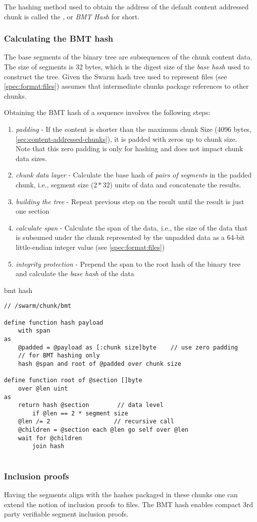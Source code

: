 The hashing method used to obtain the address of the default content addressed chunk is called the , or \emph{BMT Hash} for short. 

\subsubsection{Calculating the BMT hash}

The base segments of the binary tree are subsequences of the chunk content data. 
The size of segments is 32  bytes, which is the digest size of the \emph{base hash} used to construct the tree. 
Given the Swarm hash tree used to represent files (see \ref{spec:format:files}) assumes that intermediate chunks package references to other chunks. 

Obtaining the BMT hash of a sequence involves the following steps:

\begin{enumerate}
\item \emph{padding} - If the content is shorter than the maximum chunk Size  (4096 bytes, \ref{sec:content-addressed-chunks}), it is padded with zeros up to chunk size. Note that this zero padding is only for hashing and does not impact chunk data sizes.
\item \emph{chunk data layer} - Calculate the base hash of \emph{pairs of segments} in the padded chunk, i.e., segment size ($2 * 32$) units of data and concatenate the results.
\item \emph{building the tree} - Repeat previous step on the result until the result is just one section
\item \emph{calculate span} - Calculate the span of the data, i.e., the size of the data that is subsumed under the chunk represented by the unpadded data as a 64-bit little-endian integer value (see  \ref{spec:format:files})            
\item \emph{integrity protection} - Prepend the span to the root hash of the binary tree and calculate the \emph{base hash} of the data
\end{enumerate}

\begin{definition}{bmt hash}\label{def:bmt-hash}
\begin{lstlisting}[language=buzz1]
// /swarm/chunk/bmt

define function hash payload 
    with span
as
    @padded = @payload as [:chunk size]byte    // use zero padding 
    // for BMT hashing only
    hash @span and root of @padded over chunk size 
    
define function root of @section []byte
    over @len uint
as
    return hash @section        // data level
        if @len == 2 * segment size
    @len /= 2                  // recursive call
    @children = @section each @len go self over @len
    wait for @children 
        join hash
    

\end{lstlisting}
\end{definition}

\subsubsection{Inclusion proofs}

Having the segments align with the hashes packaged in these chunks one can extend the notion of inclusion proofs to files.
The BMT hash enables compact 3rd party verifiable segment inclusion proofs.

